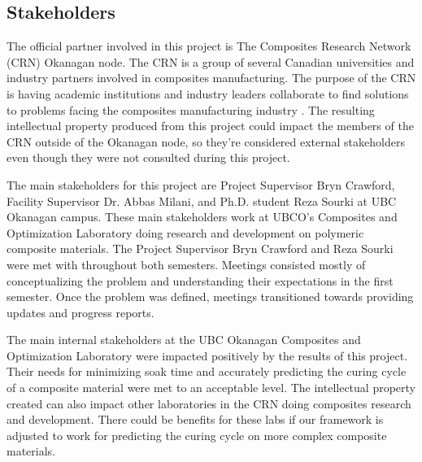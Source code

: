 \subsection{Stakeholders}
The official partner involved in this project is The Composites Research Network (CRN) Okanagan node. The CRN is a group of several Canadian universities and industry partners involved in composites manufacturing. The purpose of the CRN is having academic institutions and industry leaders collaborate to find solutions to problems facing the composites manufacturing industry \cite{crn}. The resulting intellectual property produced from this project could impact the members of the CRN outside of the Okanagan node, so they’re considered external stakeholders even though they were not consulted during this project.

The main stakeholders for this project are Project Supervisor Bryn Crawford, Facility Supervisor Dr. Abbas Milani, and Ph.D. student Reza Sourki at UBC Okanagan campus. These main stakeholders work at UBCO’s Composites and Optimization Laboratory doing research and development on polymeric composite materials. The Project Supervisor Bryn Crawford and Reza Sourki were met with throughout both semesters. Meetings consisted mostly of conceptualizing the problem and understanding their expectations in the first semester. Once the problem was defined, meetings transitioned towards providing updates and progress reports.

The main internal stakeholders at the UBC Okanagan Composites and Optimization Laboratory were impacted positively by the results of this project. Their needs for minimizing soak time and accurately predicting the curing cycle of a composite material were met to an acceptable level. The intellectual property created can also impact other laboratories in the CRN doing composites research and development. There could be benefits for these labs if our framework is adjusted to work for predicting the curing cycle on more complex composite materials.

